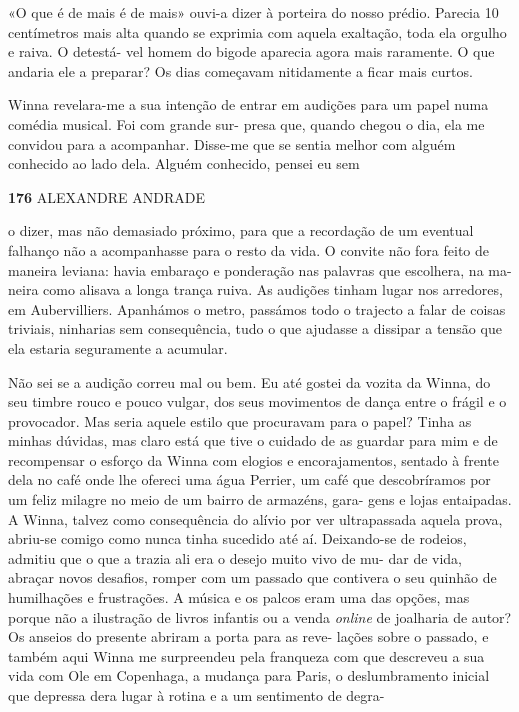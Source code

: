 «O que é de mais é de mais» ouvi-a dizer à porteira do nosso prédio.
Parecia 10 centímetros mais alta quando se exprimia com aquela
exaltação, toda ela orgulho e raiva. O detestá- vel homem do bigode
aparecia agora mais raramente. O que andaria ele a preparar? Os dias
começavam nitidamente a ficar mais curtos.

Winna revelara-me a sua intenção de entrar em audições para um papel
numa comédia musical. Foi com grande sur- presa que, quando chegou o
dia, ela me convidou para a acompanhar. Disse-me que se sentia melhor
com alguém conhecido ao lado dela. Alguém conhecido, pensei eu sem

\textbf{176 }ALEXANDRE ANDRADE

o dizer, mas não demasiado próximo, para que a recordação de um eventual
falhanço não a acompanhasse para o resto da vida. O convite não fora
feito de maneira leviana: havia embaraço e ponderação nas palavras que
escolhera, na ma- neira como alisava a longa trança ruiva. As audições
tinham lugar nos arredores, em Aubervilliers. Apanhámos o metro,
passámos todo o trajecto a falar de coisas triviais, ninharias sem
consequência, tudo o que ajudasse a dissipar a tensão que ela estaria
seguramente a acumular.

Não sei se a audição correu mal ou bem. Eu até gostei da vozita da
Winna, do seu timbre rouco e pouco vulgar, dos seus movimentos de dança
entre o frágil e o provocador. Mas seria aquele estilo que procuravam
para o papel? Tinha as minhas dúvidas, mas claro está que tive o cuidado
de as guardar para mim e de recompensar o esforço da Winna com elogios e
encorajamentos, sentado à frente dela no café onde lhe ofereci uma água
Perrier, um café que descobríramos por um feliz milagre no meio de um
bairro de armazéns, gara- gens e lojas entaipadas. A Winna, talvez como
consequência do alívio por ver ultrapassada aquela prova, abriu-se
comigo como nunca tinha sucedido até aí. Deixando-se de rodeios, admitiu
que o que a trazia ali era o desejo muito vivo de mu- dar de vida,
abraçar novos desafios, romper com um passado que contivera o seu
quinhão de humilhações e frustrações. A música e os palcos eram uma das
opções, mas porque não a ilustração de livros infantis ou a venda
\emph{online }de joalharia de autor? Os anseios do presente abriram a
porta para as reve- lações sobre o passado, e também aqui Winna me
surpreendeu pela franqueza com que descreveu a sua vida com Ole em
Copenhaga, a mudança para Paris, o deslumbramento inicial que depressa
dera lugar à rotina e a um sentimento de degra-

